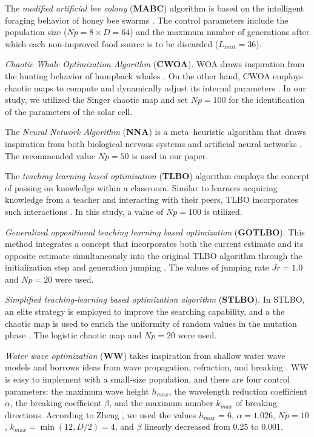 \documentclass[a4paper,fleqn]{cas-sc}
\begin{document}
The \emph{modified artificial bee colony} (\textbf{MABC}) algorithm is based
on the intelligent foraging behavior of honey bee swarms \cite{MABC}.
The control parameters include the population size ($N\!p=8\times D=64$)
and the maximum number of generations after which each non-improved food source is to be discarded ($L_{imit}=36$).

\emph{Chaotic Whale Optimization Algorithm} (\textbf{CWOA}).
WOA draws inspiration from the hunting behavior of humpback whales \cite{WOA}.
On the other hand, CWOA employs chaotic maps to compute and dynamically adjust its internal parameters \cite{CWOA}.
In our study, we utilized the Singer chaotic map and set $N\!p=100$ for the identification of the parameters of the solar cell.

The \emph{Neural Network Algorithm} (\textbf{NNA}) is a meta--heuristic algorithm that draws inspiration from
both biological nervous systems and artificial neural networks \cite{NNA}.
The recommended \cite{NNA} value $N\!p=50$ is used in our paper.

The \emph{teaching learning based optimization} (\textbf{TLBO}) algorithm employs the concept of passing on knowledge
within a classroom.
Similar to learners acquiring knowledge from a teacher and interacting with their peers,
TLBO incorporates such interactions \cite{TLBO_Patel}.
In this study, a value of $N\!p=100$ is utilized.

\emph{Generalized oppositional teaching learning based optimization} (\textbf{GOTLBO}).
This method integrates a concept that incorporates both the current estimate
and its opposite estimate simultaneously into the original TLBO algorithm
through the initialization step and generation jumping \cite{GOTLBO}.
The values of jumping rate $J\!r=1.0$ and $N\!p=20$ were used.

\emph{Simplified teaching-learning based optimization algorithm} (\textbf{STLBO}).
In STLBO, an elite strategy is employed to improve the searching capability,
and a the chaotic map is used to enrich the uniformity of random values in the mutation phase \cite{STLBO}.
The logistic chaotic map and $N\!p=20$ were used.


\emph{Water wave optimization} (\textbf{WW}) takes inspiration from shallow water wave models
and borrows ideas from wave propagation, refraction, and breaking \cite{WW}.
WW is easy to implement with a small-size population, and there are four control parameters:
the maximum wave height $h_{max}$,
the wavelength reduction coefficient $\alpha$,
the breaking coefficient $\beta$,
and the maximum number $k_{max}$ of breaking directions.
According to Zheng \cite{WW}, we used
the values $h_{max}=6$, $\alpha=1.026$,  $N\!p=10$,
$k_{max}=\min(12,D/2)=4$, and $\beta$ linearly decreased from 0.25 to 0.001.
\end{document}
